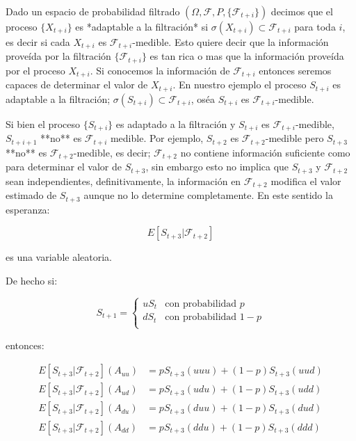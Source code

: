 \documentclass{extreport}
\theoremstyle{definicion}
\theoremstyle{propiedad}
\theoremstyle{teorema}
\begin{document}
Dado un espacio de probabilidad filtrado $(\Omega, \mathcal{F}, P, \{\mathcal{F}_{t+i}\})$ decimos que el proceso $\{X_{t+i}\}$ es *adaptable a la filtración* si $\sigma(X_{t+i})\subset \mathcal{F}_{t+i}$ para toda $i$,  es decir si cada $X_{t+i}$ es $\mathcal{F}_{t+i}$-medible. Esto quiere decir que  la información proveída por la filtración $\{\mathcal{F}_{t+i}\}$ es tan rica o mas que la información proveída por el proceso $X_{t+i}$. Si  conocemos la información de $\mathcal{F}_{t+i}$ entonces seremos capaces de determinar el valor de $X_{t+i}$. En nuestro ejemplo el proceso ${S_{t+i}}$ es adaptable a la filtración; $\sigma(S_{t+i})\subset \mathcal{F}_{t+i}$, oséa $S_{t+i}$ es $\mathcal{F}_{t+i}$-medible.

Si bien el proceso $\{S_{t+i}\}$ es adaptado a la filtración y $S_{t+i}$  es $\mathcal{F}_{t+i}$-medible, $S_{t+i+1}$ **no** es $\mathcal{F}_{t+i}$ medible. Por ejemplo, $S_{t+2}$ es $\mathcal{F}_{t+2}$-medible pero $S_{t+3}$ **no** es $\mathcal{F}_{t+2}$-medible, es decir; $\mathcal{F}_{t+2}$ no contiene información suficiente como para determinar el valor de $S_{t+3}$, sin embargo esto no implica que $S_{t+3}$ y $\mathcal{F}_{t+2}$ sean independientes, definitivamente, la información en $\mathcal{F}_{t+2}$ modifica el valor estimado de $S_{t+3}$ aunque no lo determine completamente. En este sentido la esperanza:

$$
E\left[S_{t+3}\vert \mathcal{F}_{t+2}\right]
$$

es una variable aleatoria.

De hecho si:

$$
S_{t+1} =\begin{cases}
uS_t & \text{con probabilidad }p\\
dS_t & \text{con probabilidad }1-p\\
\end{cases}
$$

entonces:


\begin{align*}
E\left[S_{t+3}\vert \mathcal{F}_{t+2}\right](A_{uu}) & = p S_{t+3}(uuu) + (1-p)S_{t+3}(uud)\\
E\left[S_{t+3}\vert \mathcal{F}_{t+2}\right](A_{ud}) & = p S_{t+3}(udu) + (1-p)S_{t+3}(udd)\\
E\left[S_{t+3}\vert \mathcal{F}_{t+2}\right](A_{du}) & = p S_{t+3}(duu) + (1-p)S_{t+3}(dud)\\
E\left[S_{t+3}\vert \mathcal{F}_{t+2}\right](A_{dd}) & = p S_{t+3}(ddu) + (1-p)S_{t+3}(ddd)
\end{align*}
\end{document}
